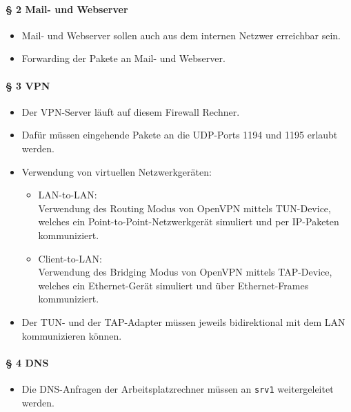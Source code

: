 \paragraph{§ 2 Mail- und Webserver}
\begin{itemize}
\item Mail- und Webserver sollen auch aus dem internen Netzwer erreichbar sein.
\item Forwarding der Pakete an Mail- und Webserver.
\end{itemize}

\paragraph{§ 3 VPN}
\begin{itemize}
\item Der VPN-Server läuft auf diesem Firewall Rechner.
\item Dafür müssen eingehende Pakete an die UDP-Ports 1194 und 1195 erlaubt werden.
\item Verwendung von virtuellen Netzwerkgeräten:
  \begin{itemize}
  \item LAN-to-LAN:\\
        Verwendung des Routing Modus von OpenVPN mittels TUN-Device,
        welches ein Point-to-Point-Netzwerkgerät simuliert und per IP-Paketen
        kommuniziert.
  \item Client-to-LAN:\\
        Verwendung des Bridging Modus von OpenVPN mittels TAP-Device,
        welches ein Ethernet-Gerät simuliert und über Ethernet-Frames
        kommuniziert.
  \end{itemize}
\item Der TUN- und der TAP-Adapter müssen jeweils bidirektional mit dem LAN kommunizieren können.
\end{itemize}

\paragraph{§ 4 DNS}
\begin{itemize}
\item Die DNS-Anfragen der Arbeitsplatzrechner müssen an {\tt srv1} weitergeleitet werden.
\end{itemize}
